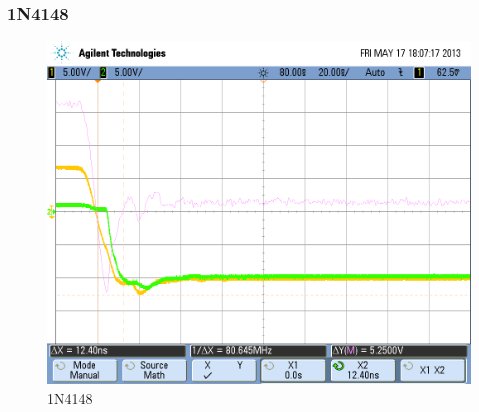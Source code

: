 \subsubsection{1N4148}
\begin{frame}
  \begin{figure}
    \includegraphics[width=1.0\columnwidth]{fig/scope_19.png}
    \caption{1N4148}
  \end{figure}
\end{frame}

